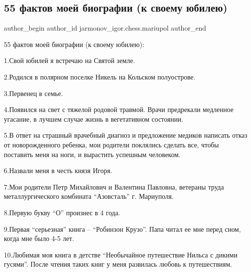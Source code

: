  
 
 
 
 

\subsection{55 фактов моей биографии (к своему юбилею)}
\label{sec:15_10_2022.fb.jarmonov_igor.chess.mariupol.1.55_faktov_moei_biogr}

\ifcmt
 author_begin
   author_id jarmonov_igor.chess.mariupol
 author_end
\fi


55 фактов моей биографии (к своему юбилею): 

1.Свой юбилей я встречаю на Святой земле.

2.Родился в полярном поселке Никель на Кольском полуострове.

3.Первенец в семье.

4.Появился на свет с тяжелой родовой травмой. Врачи предрекали медленное
угасание, в лучшем случае жизнь в вегетативном состоянии. 

5.В ответ на страшный врачебный диагноз и предложение медиков написать отказ от
новорожденного ребенка, мои родители поклялись сделать все, чтобы поставить
меня на ноги, и вырастить успешным человеком. 

6.Назвали меня в честь князя Игоря.

7.Мои родители Петр Михайлович и Валентина Павловна, ветераны труда
металлургического комбината \enquote{Азовсталь} г. Мариуполя. 

8.Первую букву \enquote{О} произнес в 4 года.

9.Первая \enquote{серьезная} книга – \enquote{Робинзон Крузо}. Папа читал ее мне перед сном,
когда мне было 4-5 лет. 

10.Любимая моя книга в детстве \enquote{Необычайное путешествие Нильса с дикими
гусями}. После чтения таких книг у меня развилась любовь к путешествиям. 


